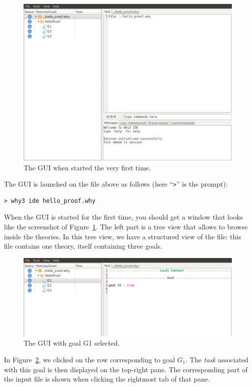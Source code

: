\begin{figure}[tbp]
  \includegraphics[width=\textwidth]{gui-1.png}
  \caption{The GUI when started the very first time.}
  \label{fig:gui1}
\end{figure}

The GUI is launched on the file above as follows
(here ``\texttt{>}'' is the prompt):
\begin{verbatim}
> why3 ide hello_proof.why
\end{verbatim}
When the GUI is started for the first time, you should get a window
that looks like the screenshot of Figure~\ref{fig:gui1}.
The left part is a tree view that
allows to browse inside the theories.
In this tree view, we have a structured view of the file: this file
contains one theory, itself containing three goals.
\begin{figure}[tbp]
 \includegraphics[width=\textwidth]{gui-2.png}
  \caption{The GUI with goal G1 selected.}
  \label{fig:gui2}
\end{figure}
In Figure~\ref{fig:gui2}, we clicked on the row corresponding to
goal $G_1$. The \emph{task} associated with this goal is then
displayed on the top-right pane. The corresponding part of the input
file is shown when clicking the rightmost tab of that pane.


